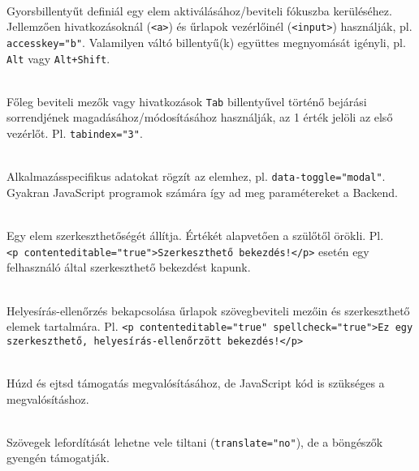 \begin{frame}
  \begin{description}[m]
    \item[\texttt{accesskey}] \hfill \\ Gyorsbillentyűt definiál egy elem aktiválásához/beviteli fókuszba kerüléséhez. Jellemzően hivatkozásoknál (\texttt{<a>}) és űrlapok vezérlőinél (\texttt{<input>}) használják, pl. \texttt{accesskey="b"}. Valamilyen váltó billentyű(k) együttes megnyomását igényli, pl. \texttt{Alt} vagy \texttt{Alt+Shift}.
    \item[\texttt{tabindex}] \hfill \\ Főleg beviteli mezők vagy hivatkozások \texttt{Tab} billentyűvel történő bejárási sorrendjének magadásához/módosításához használják, az 1 érték jelöli az első vezérlőt. Pl. \texttt{tabindex="3"}.
    \item[\texttt{data-*}] \hfill \\ Alkalmazásspecifikus adatokat rögzít az elemhez, pl. \texttt{data-toggle="modal"}. Gyakran JavaScript programok számára így ad meg paramétereket a Backend.
  \end{description}
\end{frame}

\begin{frame}
  \begin{description}[m]
    \small
    \item[\texttt{contenteditable}] \hfill \\ Egy elem szerkeszthetőségét állítja. Értékét alapvetően a szülőtől örökli. Pl.\\ \texttt{<p contenteditable="true">Szerkeszthető bekezdés!</p>} esetén egy felhasználó által szerkeszthető bekezdést kapunk.
    \item[\texttt{spellcheck}] \hfill \\ Helyesírás-ellenőrzés bekapcsolása űrlapok szövegbeviteli mezőin és szerkeszthető elemek tartalmára. Pl. \texttt{<p contenteditable="true" spellcheck="true">Ez egy szerkeszthető, helyesírás-ellenőrzött bekezdés!</p>}
    \item[\texttt{draggable, dropzone}] \hfill \\ Húzd és ejtsd támogatás megvalósításához, de JavaScript kód is szükséges a megvalósításhoz.
    \item[\texttt{translate}] \hfill \\ Szövegek lefordítását lehetne vele tiltani (\texttt{translate="no"}), de a böngészők gyengén támogatják.
  \end{description}
\end{frame}
